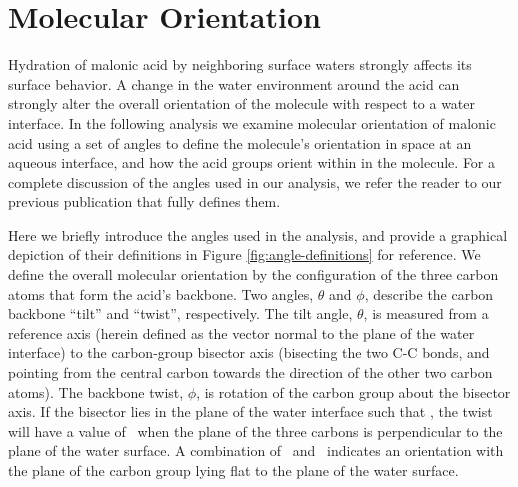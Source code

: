 \section {Molecular Orientation}

Hydration of malonic acid by neighboring surface waters strongly affects its surface behavior. A change in the water environment around the acid can strongly alter the overall orientation of the molecule with respect to a water interface. In the following analysis we examine molecular orientation of malonic acid using a set of angles to define the molecule's orientation in space at an aqueous interface, and how the acid groups orient within in the molecule. For a complete discussion of the angles used in our analysis, we refer the reader to our previous publication that fully defines them.\cite{Blower2012}

Here we briefly introduce the angles used in the analysis, and provide a graphical depiction of their definitions in Figure \ref{fig:angle-definitions} for reference. We define the overall molecular orientation by the configuration of the three carbon atoms that form the acid's backbone. Two angles, $\theta$ and $\phi$, describe the carbon backbone ``tilt'' and ``twist'', respectively. The tilt angle, $\theta$, is measured from a reference axis (herein defined as the vector normal to the plane of the water interface) to the carbon-group bisector axis (bisecting the two C-C bonds, and pointing from the central carbon towards the direction of the other two carbon atoms). The backbone twist, $\phi$, is rotation of the carbon group about the bisector axis. If the bisector lies in the plane of the water interface such that \degr, the twist will have a value of \degr~when the plane of the three carbons is perpendicular to the plane of the water surface. A combination of \degr~and \degr~indicates an orientation with the plane of the carbon group lying flat to the plane of the water surface.

